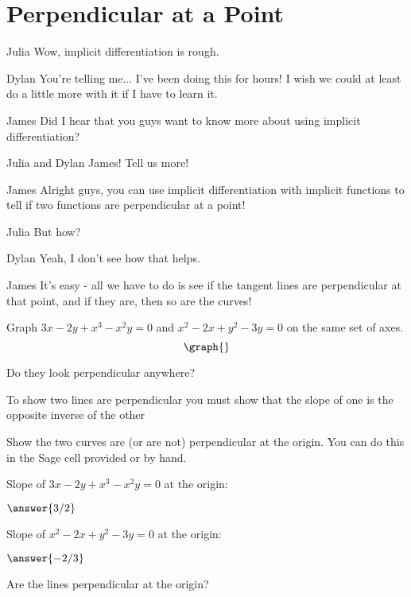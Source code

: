 \documentclass{ximera}
\begin{document}
\section{Perpendicular at a Point}
\begin{dialogue}
\item[Julia] Wow, implicit differentiation is rough.
\item[Dylan] You're telling me... I've been doing this for hours! I wish we could at least do a little more with it if I have to learn it.
\item[James] Did I hear that you guys want to know more about using implicit differentiation?
\item[Julia and Dylan] James! Tell us more!
\item[James] Alright guys, you can use implicit differentiation with implicit functions to tell if two functions are perpendicular at a point!
\item[Julia] But how?
\item[Dylan] Yeah, I don't see how that helps.
\item[James] It's easy - all we have to do is see if the tangent lines are perpendicular at that point, and if they are, then so are the curves!
\end{dialogue}
\begin{question}
Graph $3x - 2y + x^3-x^2y = 0$ and $x^2 - 2x + y^2 - 3y = 0$ on the same set of axes.
\[
\graph{}
\]

Do they look perpendicular anywhere?
\begin{multipleChoice}
\end{multipleChoice}

\begin{hint}
To show two lines are perpendicular you must show that the slope of one is the opposite inverse of the other
\end{hint}
Show the two curves are (or are not) perpendicular at the origin. You can do this in the Sage cell provided or by hand.
\begin{onlineOnly}
\begin{sageCell}

\end{sageCell}
\end{onlineOnly}
Slope of $3x - 2y + x^3-x^2y = 0$ at the origin:

$\answer{3/2}$

Slope of $x^2 - 2x + y^2 - 3y = 0$ at the origin:

$\answer{-2/3}$

Are the lines perpendicular at the origin?



\end{question}
\end{document}
